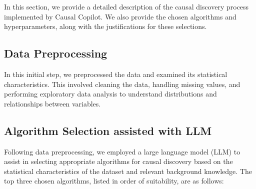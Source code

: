 \documentclass{article}
\begin{document}
In this section, we provide a detailed description of the causal discovery process implemented by Causal Copilot. 
We also provide the chosen algorithms and hyperparameters, along with the justifications for these selections.

\subsection{Data Preprocessing}
In this initial step, we preprocessed the data and examined its statistical characteristics. 
This involved cleaning the data, handling missing values, and performing exploratory data analysis to understand distributions and relationships between variables.
                
\subsection{Algorithm Selection assisted with LLM}
Following data preprocessing, we employed a large language model (LLM) to assist in 
selecting appropriate algorithms for causal discovery based on the statistical characteristics of the dataset and relevant background knowledge. 
The top three chosen algorithms, listed in order of suitability, are as follows:   
        
\end{document}
